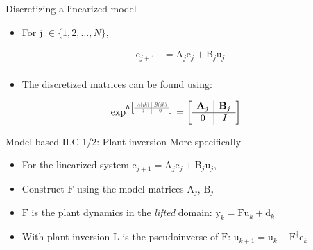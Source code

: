 \documentclass[handout]{beamer}
\newcommand{\boldvec}[1]{\boldsymbol{\mathrm{#1}}}
\let\vec\boldvec
\newcommand\scalemath[2]{\scalebox{#1}{\mbox{\ensuremath{\displaystyle #2}}}} %
\newcommand{\state}{\vec{y}} %
\newcommand{\error}{\vec{e}} %
\newcommand{\linDist}{\vec{d}} %
\newcommand{\sysInput}{\vec{u}} %
\newcommand{\lmatrix}{\vec{L}} %
\begin{document}
\begin{frame}{Discretizing a linearized model}
\begin{itemize}
\item For j $\in \{ 1, 2, \ldots, N \}$, 
\end{itemize}
\begin{equation*}
\begin{aligned}
\error_{j+1} &= \vec{A}_j\error_j + \vec{B}_j\sysInput_j \\
\end{aligned}
\end{equation*}
\begin{itemize}
\item The discretized matrices can be found using: 
\linebreak
\end{itemize}
\begin{equation*}
\begin{aligned}
\exp^{h
\left[
\scalemath{0.5}{
\begin{array}{c|c}
A(jh) & B(jh) \\ \hline
0 & 0
\end{array}}\right]}
&= 
\left[
\begin{array}{c|c}
\vec{A}_j & \vec{B}_j \\ \hline
0 & I
\end{array}\right]
\end{aligned}
\end{equation*}
\end{frame}
%
%
\begin{frame}{Model-based ILC 1/2: Plant-inversion}
More specifically
\begin{itemize}
\item For the linearized system $\error_{j+1} = \boldvec{A}_j\error_j + \boldvec{B}_j\sysInput_j$,
\item Construct $\vec{F}$ using the model matrices $\vec{A}_j$, $\vec{B}_j$
\item $\vec{F}$ is the plant dynamics in the \emph{lifted} domain: $\state_k = \vec{F}\sysInput_k + \linDist_k$
\item With plant inversion $\lmatrix$ is the pseudoinverse of $\vec{F}$: $\sysInput_{k+1} = \sysInput_{k} - \vec{F}^{\dagger}\error_{k}$
\end{itemize}
\end{frame}
%
\end{document}
